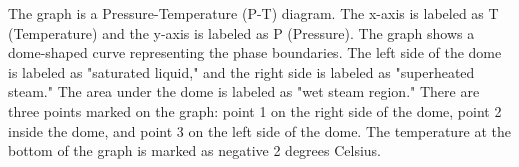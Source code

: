 The graph is a Pressure-Temperature (P-T) diagram. The x-axis is labeled as T (Temperature) and the y-axis is labeled as P (Pressure). The graph shows a dome-shaped curve representing the phase boundaries. The left side of the dome is labeled as "saturated liquid," and the right side is labeled as "superheated steam." The area under the dome is labeled as "wet steam region." There are three points marked on the graph: point 1 on the right side of the dome, point 2 inside the dome, and point 3 on the left side of the dome. The temperature at the bottom of the graph is marked as negative 2 degrees Celsius.